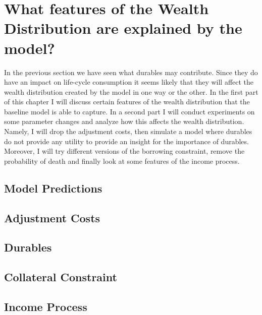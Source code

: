 \documentclass[a4paper,12pt]{article}
\begin{document}
\section{What features of the Wealth Distribution are explained by the model?}
\label{Chapter5}
In the previous section we have seen what durables may contribute. Since they do have an impact on life-cycle consumption it seems likely that they will affect the wealth distribution created by the model in one way or the other. 
In the first part of this chapter I will discuss certain features of the wealth distribution that the baseline model is able to capture. In a second part I will conduct experiments on some parameter changes and analyze how this affects the wealth distribution. Namely, I will drop the adjustment costs, then simulate a model where durables do not provide any utility to provide an insight for the importance of durables. Moreover, I will try different versions of the borrowing constraint, remove the probability of death and finally look at some features of the income process. 


\subsection{Model Predictions}

















\subsection{Adjustment Costs}

\subsection{Durables}

\subsection{Collateral Constraint}

\subsection{Income Process}
\end{document}
